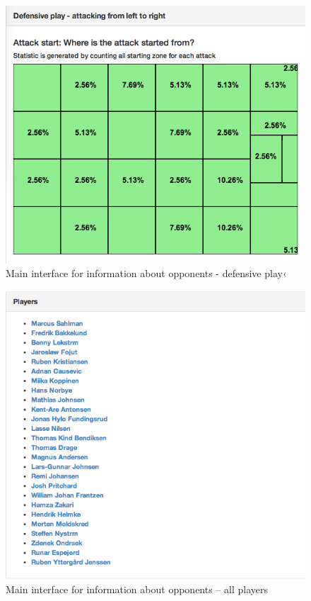 \begin{figure}[ht!]
\centering
\includegraphics[width=1\textwidth]{images/general/team_analysis3.png}
\caption{Main interface for information about opponents - defensive play‹}
\label{fig:team_analysis3}
\end{figure}

\begin{figure}[ht!]
\centering
\includegraphics[width=1\textwidth]{images/general/team_analysis4.png}
\caption{Main interface for information about opponents – all players}
\label{fig:team_analysis4}
\end{figure}

